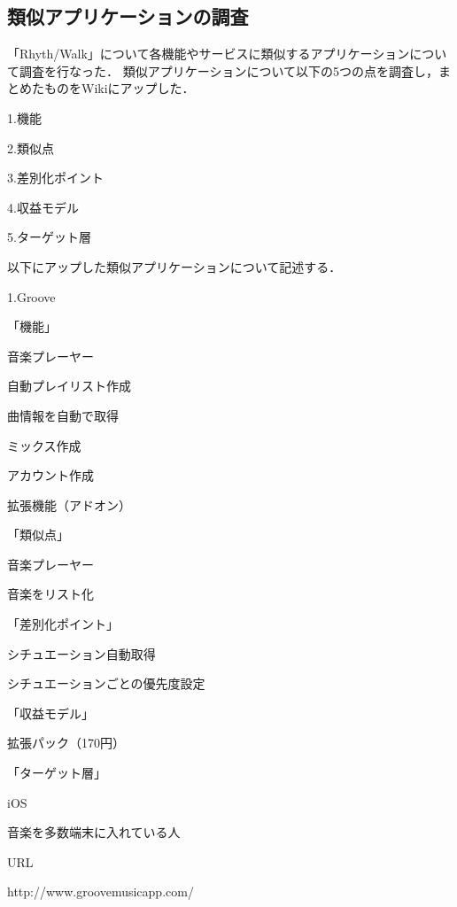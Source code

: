 \subsection{類似アプリケーションの調査}


\par 
 「Rhyth/Walk」について各機能やサービスに類似するアプリケーションについて調査を行なった．
類似アプリケーションについて以下の5つの点を調査し，まとめたものをWikiにアップした．
\par
1.機能
\par
2.類似点
\par
3.差別化ポイント
\par
4.収益モデル
\par
5.ターゲット層
\par
以下にアップした類似アプリケーションについて記述する．
\\

\par
1.Groove
\par
「機能」
\par
音楽プレーヤー
\par
自動プレイリスト作成
\par
曲情報を自動で取得
\par
ミックス作成
\par
アカウント作成
\par
拡張機能（アドオン）
\par
「類似点」
\par
音楽プレーヤー
\par
音楽をリスト化
\par
「差別化ポイント」
\par
シチュエーション自動取得
\par
シチュエーションごとの優先度設定
\par
「収益モデル」
\par
拡張パック（170円）
\par
「ターゲット層」
\par
iOS
\par
音楽を多数端末に入れている人
\par
URL
\par
http://www.groovemusicapp.com/
\\

